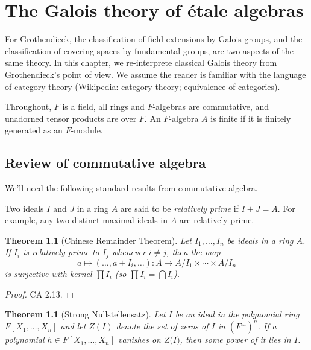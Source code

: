 \documentclass[a4paper,11pt,final,openany]{memoir}
\newtheorem{theorem}[X]{Theorem}
\theoremstyle{nonumberplain}
\newtheorem{proof}{Proof.}
\begin{document}
\clearpage


\chapter{The Galois theory of \'{e}tale algebras}

For Grothendieck, the classification of field extensions by Galois groups, and
the classification of covering spaces by fundamental groups, are two aspects
of the same theory. In this chapter, we re-interprete classical Galois theory
from Grothendieck's point of view. We assume the reader is familiar with the
language of category theory (Wikipedia: category theory; equivalence of categories).

Throughout, $F$ is a field, all rings and $F$-algebras are commutative, and
unadorned tensor products are over $F$. An $F$-algebra $A$ is finite if it is
finitely generated as an $F$-module.

\section{Review of commutative algebra}

We'll need the following standard results from commutative algebra.

Two ideals $I$ and $J$ in a ring $A$ are said to be%
\emph{relatively prime} if $I+J=A$. For example, any two distinct maximal
ideals in $A$ are relatively prime.{}

\begin{theorem}
[Chinese Remainder Theorem]\label{ca0}
%
Let $I_{1},\ldots,I_{n}$ be ideals in a ring $A$. If $I_{i}$ is relatively
prime to $I_{j}$ whenever $i\neq j$, then the map
\begin{equation}
a\mapsto(\ldots,a+I_{i},\ldots)\colon A\rightarrow A/I_{1}\times\cdots\times
A/I_{n} \label{caq1}%
\end{equation}
is surjective with kernel $\prod I_{i}$ (so $\prod I_{i}=\bigcap I_{i}$).
\end{theorem}

\begin{proof}
CA 2.13.
\end{proof}

\begin{theorem}
[Strong Nullstellensatz]\label{ca1}%
%
Let $I$ be an ideal in the polynomial ring $F[X_{1},\ldots,X_{n}]$ and let
$Z(I)$ denote the set of zeros of $I$ in $(F^{\mathrm{al}})^{n}$. If a
polynomial $h\in F[X_{1},\ldots,X_{n}]$ vanishes on $Z(I\mathfrak{)}$, then
some power of it lies in $I$.
\end{theorem}
\end{document}
